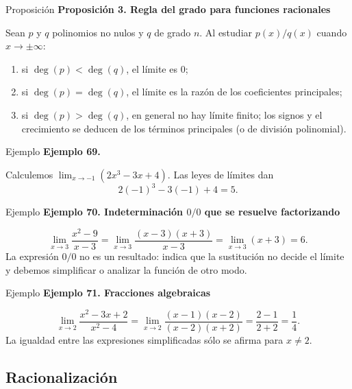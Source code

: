 \documentclass[12pt,aspectratio=169]{beamer}
\begin{document}
\begin{frame}[t,allowframebreaks]{Proposición}
{\color{azul}\bfseries Proposición 3. Regla del grado para funciones racionales}\par\medskip

Sean $p$ y $q$ polinomios no nulos y $q$ de grado $n$. Al estudiar $p(x)/q(x)$ cuando $x\to\pm\infty$:
\begin{enumerate}
\item si $\deg(p)<\deg(q)$, el límite es $0$;
\item si $\deg(p)=\deg(q)$, el límite es la razón de los coeficientes principales;
\item si $\deg(p)>\deg(q)$, en general no hay límite finito; los signos y el crecimiento se deducen de los términos principales (o de división polinomial).
\end{enumerate}
\end{frame}


\begin{frame}[t,allowframebreaks]{Ejemplo}
{\color{azul}\bfseries Ejemplo 69.}\par\medskip

Calculemos $\lim_{x\to-1}(2x^3-3x+4)$. Las leyes de límites dan
\[
2(-1)^3-3(-1)+4=\boxed{5}.
\]
\end{frame}


\begin{frame}[t,allowframebreaks]{Ejemplo}
{\color{azul}\bfseries Ejemplo 70. Indeterminación $0/0$ que se resuelve factorizando}\par\medskip

\[
\lim_{x\to3}\frac{x^2-9}{x-3}
=\lim_{x\to3}\frac{(x-3)(x+3)}{x-3}
=\lim_{x\to3}(x+3)=\boxed{6}.
\]
La expresión $0/0$ no es un resultado: indica que la sustitución no decide el límite y debemos simplificar o analizar la función de otro modo.
\end{frame}


\begin{frame}[t,allowframebreaks]{Ejemplo}
{\color{azul}\bfseries Ejemplo 71. Fracciones algebraicas}\par\medskip

\[
\lim_{x\to2}\frac{x^2-3x+2}{x^2-4}
=\lim_{x\to2}\frac{(x-1)(x-2)}{(x-2)(x+2)}
=\frac{2-1}{2+2}=\boxed{\frac14}.
\]
La igualdad entre las expresiones simplificadas sólo se afirma para $x\ne2$.
\end{frame}


\subsection{Racionalización}
\end{document}
